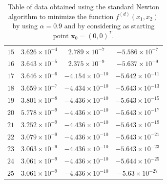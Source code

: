 \documentclass[a4paper,11pt]{article}
\begin{document}
\begin{table}[H]
\begin{tabular}{|c|c|c|c|}
			$15$ & $3.626\times10^{-4}$ & $2.789\times10^{-7}$ & $-5.586\times10^{-7}$ \\
			$16$ & $3.643\times10^{-5}$ & $2.375\times10^{-9}$ & $-5.637\times10^{-9}$ \\
			$17$ & $3.646\times10^{-6}$ & $-4.154\times10^{-10}$ & $-5.642\times10^{-11}$ \\
			$18$ & $3.659\times10^{-7}$ & $-4.434\times10^{-10}$ & $-5.643\times10^{-13}$ \\
			$19$ & $3.801\times10^{-8}$ & $-4.436\times10^{-10}$ & $-5.643\times10^{-15}$ \\
			$20$ & $5.778\times10^{-9}$ & $-4.436\times10^{-10}$ & $-5.643\times10^{-17}$ \\
			$21$ & $3.252\times10^{-9}$ & $-4.436\times10^{-10}$ & $-5.643\times10^{-19}$ \\
			$22$ & $3.079\times10^{-9}$ & $-4.436\times10^{-10}$ & $-5.643\times10^{-21}$ \\
			$23$ & $3.063\times10^{-9}$ & $-4.436\times10^{-10}$ & $-5.643\times10^{-23}$ \\
			$24$ & $3.061\times10^{-9}$ & $-4.436\times10^{-10}$ & $-5.644\times10^{-25}$ \\
			$25$ & $3.061\times10^{-9}$ & $-4.436\times10^{-10}$ & $-5.63\times10^{-27}$ \\
			\hline
		\end{tabular}
		\caption{Table of data obtained using the standard Newton algorithm to minimize the function $f^{(d)}(x_{1},x_{2})$ by using $\alpha=0.9$ and by considering as starting point $\textbf{x}_{0}=(0,0)^{T}$.}
	\end{table}
	
\end{document}
